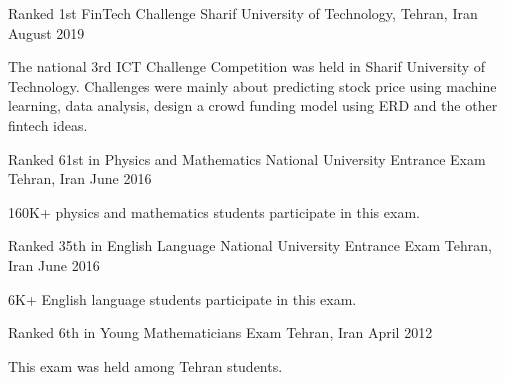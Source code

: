 \begin{cventries}
	
  \cventry
	{}
	{Ranked 1st FinTech Challenge}
	{Sharif University of Technology, Tehran, Iran}
	{August 2019}
	{
		\begin{cvitems}
			{
				The national 3rd ICT Challenge Competition was held in Sharif University of Technology. Challenges were mainly about predicting stock price using machine learning, data analysis, design a crowd funding model using ERD and the other fintech ideas.
			}
		\end{cvitems}
	}
  \cventry
    {}
    {Ranked 61st in Physics and Mathematics National University Entrance Exam}
    {Tehran, Iran}
    {June 2016}
    {
      \begin{cvitems}
        {160K+ physics and mathematics students participate in this exam. }
      \end{cvitems}
    }
    \cventry
    {}
    {Ranked 35th in English Language National University Entrance Exam}
    {Tehran, Iran}
    {June 2016}
    {
      \begin{cvitems}
         {6K+ English language students participate in this exam. }
      \end{cvitems}
    }
  \cventry
    {}
    {Ranked 6th in Young Mathematicians Exam}
    {Tehran, Iran}
    {April 2012}
    {
      \begin{cvitems}
         {This exam was held among Tehran students. }
      \end{cvitems}
    }
\end{cventries}
